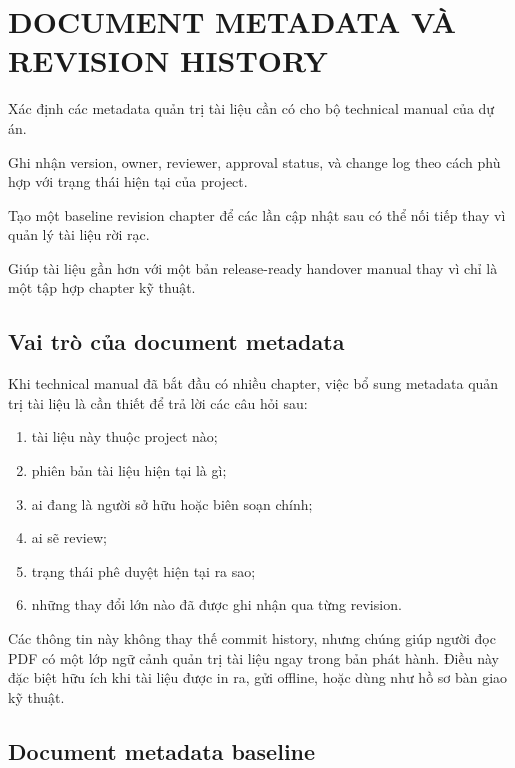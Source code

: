 \chapter{DOCUMENT METADATA VÀ REVISION HISTORY}

\begin{ChapterObjectives}
\item Xác định các metadata quản trị tài liệu cần có cho bộ technical manual của dự án.
\item Ghi nhận version, owner, reviewer, approval status, và change log theo cách phù hợp với trạng thái hiện tại của project.
\item Tạo một baseline revision chapter để các lần cập nhật sau có thể nối tiếp thay vì quản lý tài liệu rời rạc.
\item Giúp tài liệu gần hơn với một bản release-ready handover manual thay vì chỉ là một tập hợp chapter kỹ thuật.
\end{ChapterObjectives}

\section{Vai trò của document metadata}

Khi technical manual đã bắt đầu có nhiều chapter, việc bổ sung metadata quản trị tài liệu là cần thiết để trả lời các câu hỏi sau:

\begin{enumerate}[label=-]
\item tài liệu này thuộc project nào;
\item phiên bản tài liệu hiện tại là gì;
\item ai đang là người sở hữu hoặc biên soạn chính;
\item ai sẽ review;
\item trạng thái phê duyệt hiện tại ra sao;
\item những thay đổi lớn nào đã được ghi nhận qua từng revision.
\end{enumerate}

Các thông tin này không thay thế commit history, nhưng chúng giúp người đọc PDF có một lớp ngữ cảnh quản trị tài liệu ngay trong bản phát hành. Điều này đặc biệt hữu ích khi tài liệu được in ra, gửi offline, hoặc dùng như hồ sơ bàn giao kỹ thuật.

\section{Document metadata baseline}

